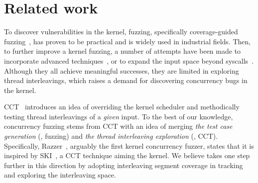 \section{Related work}
\label{s:relwk}

%


%
To discover vulnerabilities in the kernel, fuzzing, specifically
coverage-guided fuzzing~\cite{syzkaller, moonshine, healer, hfl, imf,
  janus, hydra, trinity, kafl, periscope, syzvegas, ksg}, has proven
to be practical and is widely used in industrial fields.
%
%
Then, to further improve a kernel fuzzing, a number of attempts have
been made to incorporate advanced techniques~\cite{moonshine, healer, hfl},
%
or to expand the input space beyond syscalls~\cite{janus, hydra,
  periscope}.
%
Although they all achieve meaningful successes, they are limited in
exploring thread interleavings, which raises a demand for discovering
concurrency bugs in the kernel.







%
CCT~\cite{ski, pctalgorithm, sparsernr, chess,
  nagarakatte2012multicore, abdelrasoul2017promoting, cai2016radius,
  mukherjee2020learning, schedulebounding} introduces an idea of
overriding the kernel scheduler and methodically testing thread
interleavings of a \textit{given} input.
%
%
To the best of our knowledge, concurrency fuzzing stems from CCT with
an idea of merging \textit{the test case generation} (\ie, fuzzing)
and \textit{the thread interleaving exploration} (\ie, CCT).
%
Specifically, Razzer~\cite{razzer}, arguably the first kernel
concurrency fuzzer, states that it is inspired by SKI~\cite{ski}, a
CCT technique aiming the kernel.
%
We believe \sys takes one step further in this direction by adopting
interleaving segment coverage in tracking and exploring the
interleaving space.
%
%



